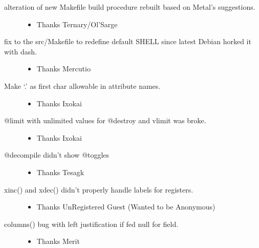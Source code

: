 \documentclass[letterpaper,10pt,english]{sphinxmanual}
\begin{document}
\begin{description}
\begin{itemize}
\end{itemize}

\item[{alteration of new Makefile build procedure rebuilt based on \sphinxhref{mailto:Ternary@Dark}{Ternary@Dark} Metal’s suggestions.}] \leavevmode\begin{itemize}
\item {} 
\sphinxAtStartPar
Thanks Ternary/Ol’Sarge

\end{itemize}

\item[{fix to the src/Makefile to redefine default SHELL since latest Debian horked it with dash.}] \leavevmode\begin{itemize}
\item {} 
\sphinxAtStartPar
Thanks Mercutio

\end{itemize}

\item[{Make ‘.’ as first char allowable in attribute names.}] \leavevmode\begin{itemize}
\item {} 
\sphinxAtStartPar
Thanks Ixokai

\end{itemize}

\item[{@limit with unlimited values for @destroy and vlimit was broke.}] \leavevmode\begin{itemize}
\item {} 
\sphinxAtStartPar
Thanks Ixokai

\end{itemize}

\item[{@decompile didn’t show @toggles}] \leavevmode\begin{itemize}
\item {} 
\sphinxAtStartPar
Thanks Tesagk

\end{itemize}

\item[{xinc() and xdec() didn’t properly handle labels for registers.}] \leavevmode\begin{itemize}
\item {} 
\sphinxAtStartPar
Thanks UnRegistered Guest (Wanted to be Anonymous)

\end{itemize}

\item[{columns() bug with left justification if fed null for field.}] \leavevmode\begin{itemize}
\item {} 
\sphinxAtStartPar
Thanks Merit


\end{itemize}
\end{description}
\end{document}
